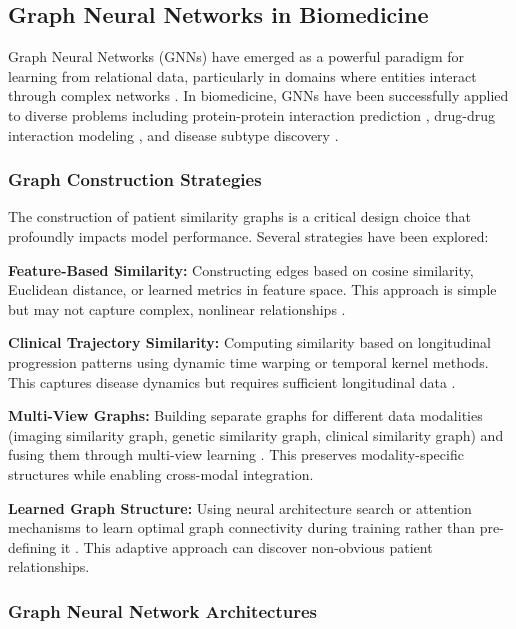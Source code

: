\documentclass[conference]{IEEEtran}
\begin{document}
\subsection{Graph Neural Networks in Biomedicine}

Graph Neural Networks (GNNs) have emerged as a powerful paradigm for learning from relational data, particularly in domains where entities interact through complex networks \cite{Wu2021}. In biomedicine, GNNs have been successfully applied to diverse problems including protein-protein interaction prediction \cite{Zitnik2018}, drug-drug interaction modeling \cite{Duvenaud2015}, and disease subtype discovery \cite{Parisot2018}.

\subsubsection{Graph Construction Strategies}

The construction of patient similarity graphs is a critical design choice that profoundly impacts model performance. Several strategies have been explored:

\textbf{Feature-Based Similarity:} Constructing edges based on cosine similarity, Euclidean distance, or learned metrics in feature space. This approach is simple but may not capture complex, nonlinear relationships \cite{Safai2022}.

\textbf{Clinical Trajectory Similarity:} Computing similarity based on longitudinal progression patterns using dynamic time warping or temporal kernel methods. This captures disease dynamics but requires sufficient longitudinal data \cite{Kim2021}.

\textbf{Multi-View Graphs:} Building separate graphs for different data modalities (imaging similarity graph, genetic similarity graph, clinical similarity graph) and fusing them through multi-view learning \cite{Zhang2025}. This preserves modality-specific structures while enabling cross-modal integration.

\textbf{Learned Graph Structure:} Using neural architecture search or attention mechanisms to learn optimal graph connectivity during training rather than pre-defining it \cite{Neves2024}. This adaptive approach can discover non-obvious patient relationships.

\subsubsection{Graph Neural Network Architectures}
\end{document}
